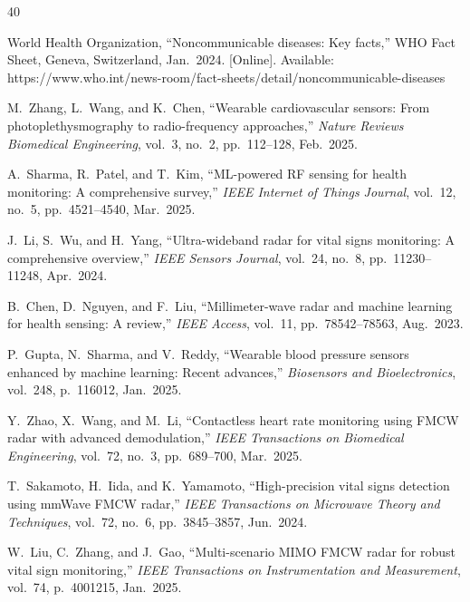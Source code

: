 \documentclass[journal,twoside]{IEEEtran}
\begin{document}
\balance
\begin{thebibliography}{40}

World Health Organization, ``Noncommunicable diseases: Key facts,'' WHO Fact Sheet, Geneva, Switzerland, Jan.\ 2024. [Online]. Available: https://www.who.int/news-room/fact-sheets/detail/noncommunicable-diseases

M.~Zhang, L.~Wang, and K.~Chen, ``Wearable cardiovascular sensors: From photoplethysmography to radio-frequency approaches,'' \emph{Nature Reviews Biomedical Engineering}, vol.~3, no.~2, pp.~112--128, Feb.\ 2025.

A.~Sharma, R.~Patel, and T.~Kim, ``ML-powered RF sensing for health monitoring: A comprehensive survey,'' \emph{IEEE Internet of Things Journal}, vol.~12, no.~5, pp.~4521--4540, Mar.\ 2025.

J.~Li, S.~Wu, and H.~Yang, ``Ultra-wideband radar for vital signs monitoring: A comprehensive overview,'' \emph{IEEE Sensors Journal}, vol.~24, no.~8, pp.~11230--11248, Apr.\ 2024.

B.~Chen, D.~Nguyen, and F.~Liu, ``Millimeter-wave radar and machine learning for health sensing: A review,'' \emph{IEEE Access}, vol.~11, pp.~78542--78563, Aug.\ 2023.

P.~Gupta, N.~Sharma, and V.~Reddy, ``Wearable blood pressure sensors enhanced by machine learning: Recent advances,'' \emph{Biosensors and Bioelectronics}, vol.~248, p.~116012, Jan.\ 2025.

Y.~Zhao, X.~Wang, and M.~Li, ``Contactless heart rate monitoring using FMCW radar with advanced demodulation,'' \emph{IEEE Transactions on Biomedical Engineering}, vol.~72, no.~3, pp.~689--700, Mar.\ 2025.

T.~Sakamoto, H.~Iida, and K.~Yamamoto, ``High-precision vital signs detection using mmWave FMCW radar,'' \emph{IEEE Transactions on Microwave Theory and Techniques}, vol.~72, no.~6, pp.~3845--3857, Jun.\ 2024.

W.~Liu, C.~Zhang, and J.~Gao, ``Multi-scenario MIMO FMCW radar for robust vital sign monitoring,'' \emph{IEEE Transactions on Instrumentation and Measurement}, vol.~74, p.~4001215, Jan.\ 2025.


\end{thebibliography}
\end{document}
